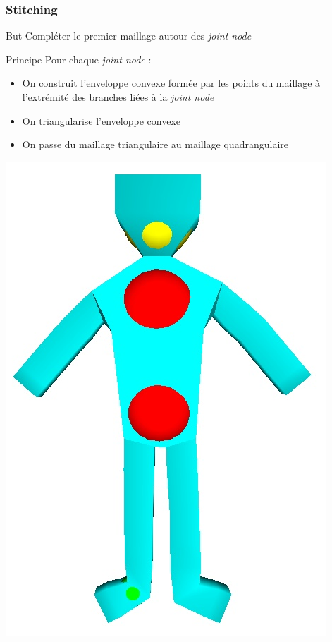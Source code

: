 \documentclass[9pt]{beamer}
\begin{document}
\begin{frame}
	\frametitle{Stitching}
	\begin{block}{But}
		Compléter le premier maillage autour des \textit{joint node}
	\end{block}
	\begin{block}{Principe}
		Pour chaque \textit{joint node} :
		\begin{itemize}
				\item On construit l'enveloppe convexe formée par les points du maillage à l'extrémité des branches liées à la \textit{joint node}
				\item On triangularise l'enveloppe convexe
				\item On passe du maillage triangulaire au maillage quadrangulaire
		\end{itemize}
	\end{block}
	\begin{center}
	\includegraphics[scale=0.15]{images/stitching.png}
	\end{center}
\end{frame}
\end{document}
